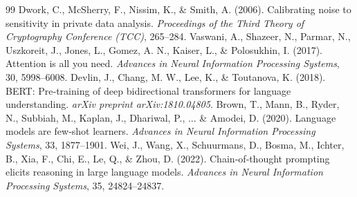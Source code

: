 \documentclass[12pt,twoside]{article}
\begin{document}
\begin{thebibliography}{99}
 Dwork, C., McSherry, F., Nissim, K., \& Smith, A. (2006). Calibrating noise to sensitivity in private data analysis. \textit{Proceedings of the Third Theory of Cryptography Conference (TCC)}, 265–284.
 Vaswani, A., Shazeer, N., Parmar, N., Uszkoreit, J., Jones, L., Gomez, A. N., Kaiser, L., \& Polosukhin, I. (2017). Attention is all you need. \textit{Advances in Neural Information Processing Systems}, 30, 5998–6008.
 Devlin, J., Chang, M. W., Lee, K., \& Toutanova, K. (2018). BERT: Pre‑training of deep bidirectional transformers for language understanding. \textit{arXiv preprint arXiv:1810.04805}.
 Brown, T., Mann, B., Ryder, N., Subbiah, M., Kaplan, J., Dhariwal, P., ... \& Amodei, D. (2020). Language models are few‑shot learners. \textit{Advances in Neural Information Processing Systems}, 33, 1877–1901.
 Wei, J., Wang, X., Schuurmans, D., Bosma, M., Ichter, B., Xia, F., Chi, E., Le, Q., \& Zhou, D. (2022). Chain‑of‑thought prompting elicits reasoning in large language models. \textit{Advances in Neural Information Processing Systems}, 35, 24824–24837.
\end{thebibliography}
\end{document}

